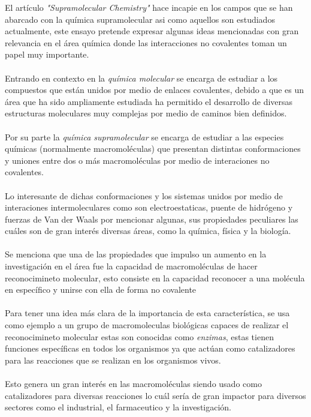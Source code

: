 \documentclass[10pt]{article}
\title{\bt{Alcance de la quimica supramolecular}}
\author{Perez Alvarado Luis Raymundo, Facultad de Quimica, UNAM}
\date{7 de Octubre de 2020}
\newcommand{\np}[1]{\paragraph{\normalfont{#1}}}
\newcommand{\et}[1]{\emph{#1}}
\begin{document}
    \maketitle

    El artículo \et{"Supramolecular Chemistry"} \cite{article:article} hace incapie en los campos que se han abarcado con la química supramolecular asi como aquellos son estudiados actualmente, este ensayo\cite{web:Elsevier} pretende expresar algunas ideas mencionadas con gran relevancia en el área química donde las interacciones no covalentes toman un papel muy importante. \np{}

    Entrando en contexto en la \et{química molecular} se encarga de estudiar a los compuestos que están unidos por medio de enlaces covalentes, debido a que es un área que ha sido ampliamente estudiada ha permitido el desarrollo de diversas estructuras moleculares muy complejas por medio de caminos bien definidos.\np{}

    Por su parte la \et{química supramolecular} se encarga de estudiar a las especies químicas 
    (normalmente macromoléculas) que presentan distintas conformaciones y uniones entre dos o más macromoléculas por medio de interaciones no covalentes.\np{}

    Lo interesante de dichas conformaciones y los sistemas unidos por medio de interaciones intermoleculares como son electroestaticas, puente de hidrógeno y fuerzas de Van der Waals por mencionar algunas, sus propiedades peculiares las cuáles son de gran interés diversas áreas, como la química, física y la biología.\np{}
    
    Se menciona que una de las propiedades que impulso un aumento en la investigación en el área fue la capacidad de macromoléculas de hacer reconocimineto molecular, esto consiste en la capacidad reconocer a una molécula en específico y unirse con ella de forma no covalente \np{}
    
    Para tener una idea más clara de la importancia de esta característica, se usa como ejemplo a un grupo de macromoleculas biológicas capaces de realizar el reconocimineto molecular estas son conocidas como \et{enzimas}, estas tienen funciones específicas en todos los organismos ya que actúan como catalizadores para las reacciones que se realizan en los organismos vivos.\np{}

    Esto genera un gran interés en las macromoléculas siendo usado como catalizadores para diversas reacciones lo cuál sería de gran impactor para diversos sectores como el industrial, el farmaceutico y la investigación.\np{}
\end{document}
